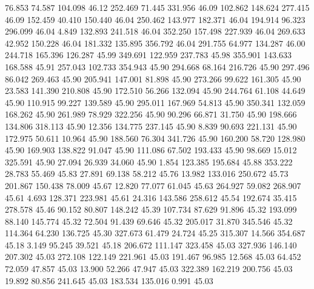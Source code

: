   76.853   74.587  104.098        46.12
 252.469   71.445  331.956        46.09
 102.862  148.624  277.415        46.09
 152.459   40.410  150.440        46.04
 250.462  143.977  182.371        46.04
 194.914   96.323  296.099        46.04
   4.849  132.893  241.518        46.04
 352.250  157.498  227.939        46.04
 269.633   42.952  150.228        46.04
 181.332  135.895  356.792        46.04
 291.755   64.977  134.287        46.00
 244.718  165.396  126.287        45.99
 349.691  122.959  237.783        45.98
 355.901  143.633  168.588        45.91
 257.043  102.733  354.943        45.90
 294.668   68.164  216.726        45.90
 297.496   86.042  269.463        45.90
 205.941  147.001   81.898        45.90
 273.266   99.622  161.305        45.90
  23.583  141.390  210.808        45.90
 172.510   56.266  132.094        45.90
 244.764   61.108   44.649        45.90
 110.915   99.227  139.589        45.90
 295.011  167.969   54.813        45.90
 350.341  132.059  168.262        45.90
 261.989   78.929  322.256        45.90
  90.296   66.871   31.750        45.90
 198.666  134.806  318.113        45.90
  12.356  134.775  237.145        45.90
   8.839   90.693  221.131        45.90
 172.975   50.611   10.964        45.90
 188.560   76.304  341.726        45.90
 160.200   58.720  128.980        45.90
 169.903  138.822   91.047        45.90
 111.086   67.502  193.433        45.90
  98.669   15.012  325.591        45.90
  27.094   26.939   34.060        45.90
   1.854  123.385  195.684        45.88
 353.222   28.783   55.469        45.83
  27.891   69.138   58.212        45.76
  13.982  133.016  250.672        45.73
 201.867  150.438   78.009        45.67
  12.820   77.077   61.045        45.63
 264.927   59.082  268.907        45.61
   4.693  128.371  223.981        45.61
  24.316  143.586  258.612        45.54
 192.674   35.415  278.578        45.46
  90.152   80.807  148.242        45.39
 107.734   87.629   91.896        45.32
 193.099   88.140  145.774        45.32
  72.504   91.439   69.646        45.32
 205.017   31.870  345.546        45.32
 114.364   64.230  136.725        45.30
 327.673   61.479   24.724        45.25
 315.307   14.566  354.687        45.18
   3.149   95.245   39.521        45.18
 206.672  111.147  323.458        45.03
 327.936  146.140  207.302        45.03
 272.108  122.149  221.961        45.03
 191.467   96.985   12.568        45.03
  64.452   72.059   47.857        45.03
  13.900   52.266   47.947        45.03
 322.389  162.219  200.756        45.03
  19.892   80.856  241.645        45.03
 183.534  135.016    0.991        45.03
